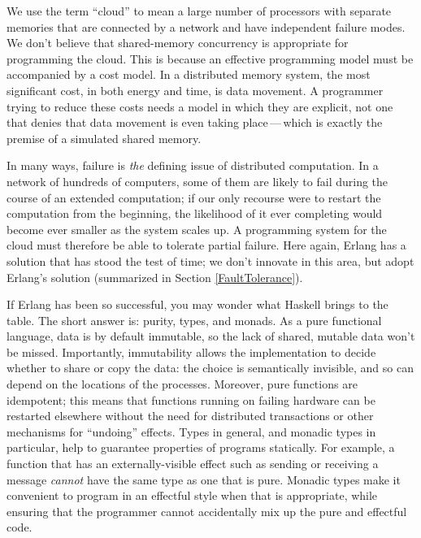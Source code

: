 \documentclass[preprint]{sigplanconf}
\begin{document}
We use the term ``cloud'' to mean a large number of processors with separate memories that are connected by a network and have independent failure modes.
We don't believe that shared-memory concurrency is appropriate for programming the cloud.
This is because an effective programming model must be accompanied by a cost model.
In a distributed memory system, the most significant cost, in both energy and time, is data movement.
A programmer trying to reduce these costs needs a model in which they are explicit, not one that denies that data movement is even taking place\,---\,which is exactly the premise of a simulated shared memory. 

In many ways, failure is \emph{the} defining issue of distributed computation.  
In a network of hundreds of computers, some of them are likely to fail during the course of an extended computation; if our only recourse were to restart the computation from the beginning, the likelihood of it ever completing would become ever smaller as the system scales up.  
A programming system for the cloud must therefore be able to tolerate partial failure.  Here again, Erlang has a solution that has stood the test of time; 
we don't innovate in this area, but adopt Erlang's solution (summarized in Section \ref{FaultTolerance}).

If Erlang has been so successful, you may wonder what Haskell brings to the table. 
The short answer is: purity, types, and monads. 
As a pure functional language, data is by default immutable, so the lack of shared, mutable data won't be missed. 
Importantly, immutability allows the implementation to decide whether to share or copy the data: the choice is semantically invisible, and so can depend on the locations of the processes. 
Moreover, pure functions are idempotent; this means that functions running on failing hardware can be restarted elsewhere without the need for distributed transactions or other mechanisms for ``undoing'' effects.  
Types in general, and monadic types in particular, help to guarantee properties of programs statically.  
For example, a function that has an externally-visible effect such as sending or receiving a message \emph{cannot} have the same type as one that is pure.
Monadic types make it convenient to program in an effectful style when that is appropriate, while ensuring that the programmer cannot accidentally mix up the pure and effectful code.
\end{document}
